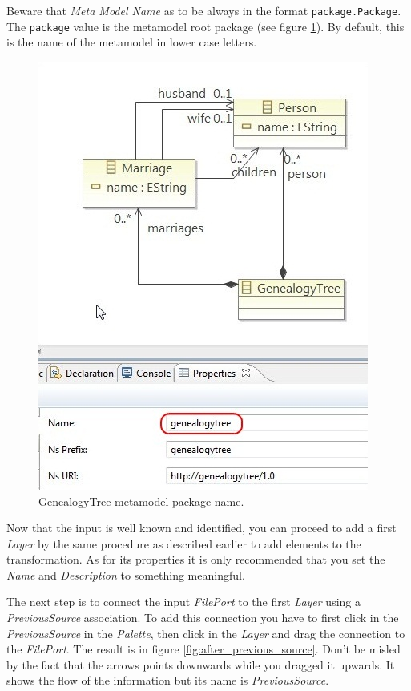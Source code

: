 Beware that \emph{Meta Model Name} as to be always in the format
\verb=package.Package=. The \verb=package= value is the metamodel root package
(see figure \ref{fig:package_name}). By default, this is the name of the
metamodel in lower case letters.


\begin{figure}[h]
\begin{center}
  \includegraphics[scale=0.7]{imgs/package_name.jpg}
  \caption{GenealogyTree metamodel package name.}
  \label{fig:package_name}
\end{center}
\end{figure}


Now that the input is well known and identified, you can proceed to add a
first \emph{Layer} by the same procedure as described earlier to add elements to the
transformation. As for its properties it is only recommended that
you set the \emph{Name} and \emph{Description} to something meaningful.

The next step is to connect the input \emph{FilePort} to the first \emph{Layer}
using a \emph{PreviousSource} association. To add this connection you have to
first click in the \emph{PreviousSource} in the \emph{Palette}, then click in
the \emph{Layer} and drag the connection to the \emph{FilePort}. The result is
in figure \ref{fig:after_previous_source}. Don't be misled by the fact that the
arrows points downwards while you dragged it upwards. It
shows the flow of the information but its name is \emph{PreviousSource}.

